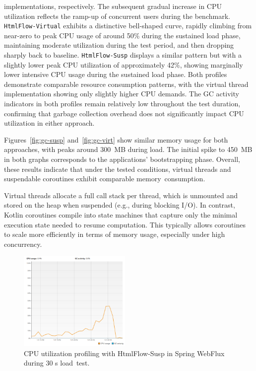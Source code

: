 \documentclass[software,article,accept,pdftex,moreauthors]{Definitions/mdpi}
\begin{document}
 implementations,
respectively. The subsequent gradual increase in CPU utilization reflects the
ramp-up of concurrent users during the benchmark. \texttt{HtmlFlow-Virtual}
exhibits a distinctive bell-shaped curve, rapidly climbing from near-zero to
peak CPU usage of around 50\% during the sustained load phase, maintaining
moderate utilization during the test period, and then dropping sharply back to
baseline. \texttt{HtmlFlow-Susp} displays a similar pattern but with a slightly
lower peak CPU utilization of approximately 42\%, showing marginally lower
intensive CPU usage during the sustained load phase. Both profiles demonstrate
comparable resource consumption patterns, with the virtual thread
implementation showing only slightly higher CPU demands. The GC activity
indicators in both profiles remain relatively low throughout the test duration,
confirming that garbage collection overhead does not significantly impact CPU
utilization in either approach.

Figures~\ref{fig:gc-susp} and~\ref{fig:gc-virt} show similar memory usage for
both approaches, with peaks around 300~MB during load. The initial spike to
450~MB in both graphs corresponds to the applications' bootstrapping phase.
Overall, these results indicate that under the tested conditions, virtual
threads and suspendable coroutines exhibit comparable memory~consumption.

Virtual threads allocate a full call stack per thread, which is unmounted and
stored on the heap when suspended (e.g., during blocking I/O). In contrast,
Kotlin coroutines compile into state machines that capture only the minimal
execution state needed to resume computation. This typically allows coroutines
to scale more efficiently in terms of memory usage, especially under high
concurrency.

\begin{figure}[H]
\vspace{-3pt}
     \includegraphics[width=0.48\textwidth]{./Graphs/cpu-susp.png}
     \caption{CPU utilization profiling with HtmlFlow-Susp in Spring WebFlux during 30 s load~test.}     \label{fig:cpu-susp}
\end{figure}
\end{document}
